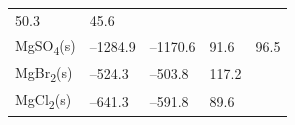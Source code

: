 \documentclass[
  9pt,
]{extbook}
\theoremstyle{definition}
\theoremstyle{definition}
\theoremstyle{definition}
\theoremstyle{remark}
\begin{document}
\begin{longtable}[]{@{}lllll@{}}
\begin{minipage}[t]{0.18\columnwidth}
50.3\strut
\end{minipage} & \begin{minipage}[t]{0.18\columnwidth}\raggedright
45.6\strut
\end{minipage}\tabularnewline
\begin{minipage}[t]{0.10\columnwidth}\raggedright
MgSO\textsubscript{4}(s)\strut
\end{minipage} & \begin{minipage}[t]{0.19\columnwidth}\raggedright
--1284.9\strut
\end{minipage} & \begin{minipage}[t]{0.20\columnwidth}\raggedright
--1170.6\strut
\end{minipage} & \begin{minipage}[t]{0.18\columnwidth}\raggedright
91.6\strut
\end{minipage} & \begin{minipage}[t]{0.18\columnwidth}\raggedright
96.5\strut
\end{minipage}\tabularnewline
\begin{minipage}[t]{0.10\columnwidth}\raggedright
MgBr\textsubscript{2}(s)\strut
\end{minipage} & \begin{minipage}[t]{0.19\columnwidth}\raggedright
--524.3\strut
\end{minipage} & \begin{minipage}[t]{0.20\columnwidth}\raggedright
--503.8\strut
\end{minipage} & \begin{minipage}[t]{0.18\columnwidth}\raggedright
117.2\strut
\end{minipage} & \begin{minipage}[t]{0.18\columnwidth}\raggedright
\strut
\end{minipage}\tabularnewline
\begin{minipage}[t]{0.10\columnwidth}\raggedright
MgCl\textsubscript{2}(s)\strut
\end{minipage} & \begin{minipage}[t]{0.19\columnwidth}\raggedright
--641.3\strut
\end{minipage} & \begin{minipage}[t]{0.20\columnwidth}\raggedright
--591.8\strut
\end{minipage} & \begin{minipage}[t]{0.18\columnwidth}\raggedright
89.6\strut
\end{minipage} & \begin{minipage}[t]{0.18\columnwidth}\raggedright

\end{minipage}
\end{longtable}
\end{document}
